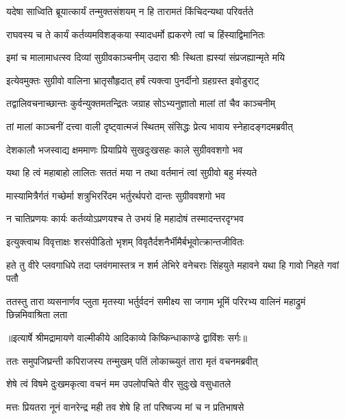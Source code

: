\twolineshloka
{यदेषा साध्विति ब्रूयात्कार्यं तन्मुक्तसंशयम्}
{न हि तारामतं किंचिदन्यथा परिवर्तते} %

\twolineshloka
{राघवस्य च ते कार्यं कर्तव्यमविशङ्कया}
{स्यादधर्मो ह्यकरणे त्वां च हिंस्याद्विमानितः} %

\twolineshloka
{इमां च मालामाधत्स्व दिव्यां सुग्रीवकाञ्चनीम्}
{उदारा श्रीः स्थिता ह्यस्यां संप्रजह्यान्मृते मयि} %

\twolineshloka
{इत्येवमुक्तः सुग्रीवो वालिना भ्रातृसौहृदात्}
{हर्षं त्यक्त्वा पुनर्दीनो ग्रहग्रस्त इवोडुराट्} %

\twolineshloka
{तद्वालिवचनाच्छान्तः कुर्वन्युक्तमतन्द्रितः}
{जग्राह सोऽभ्यनुज्ञातो मालां तां चैव काञ्चनीम्} %

\twolineshloka
{तां मालां काञ्चनीं दत्त्वा वाली दृष्ट्वात्मजं स्थितम्}
{संसिद्धः प्रेत्य भावाय स्नेहादङ्गदमब्रवीत्} %

\twolineshloka
{देशकालौ भजस्वाद्य क्षममाणः प्रियाप्रिये}
{सुखदुःखसहः काले सुग्रीववशगो भव} %

\twolineshloka
{यथा हि त्वं महाबाहो लालितः सततं मया}
{न तथा वर्तमानं त्वां सुग्रीवो बहु मंस्यते} %

\twolineshloka
{मास्यामित्रैर्गतं गच्छेर्मा शत्रुभिररिंदम}
{भर्तुरर्थपरो दान्तः सुग्रीववशगो भव} %

\twolineshloka
{न चातिप्रणयः कार्यः कर्तव्योऽप्रणयश्च ते}
{उभयं हि महादोषं तस्मादन्तरदृग्भव} %

\twolineshloka
{इत्युक्त्वाथ विवृत्ताक्षः शरसंपीडितो भृशम्}
{विवृतैर्दशनैर्भीमैर्बभूवोत्क्रान्तजीवितः} %

\fourlineindentedshloka
{हते तु वीरे प्लवगाधिपे तदा}
{ प्लवंगमास्तत्र न शर्म लेभिरे}
{वनेचराः सिंहयुते महावने}
{ यथा हि गावो निहते गवां पतौ} %

\fourlineindentedshloka
{ततस्तु तारा व्यसनार्णव प्लुता}
{ मृतस्या भर्तुर्वदनं समीक्ष्य सा}
{जगाम भूमिं परिरभ्य वालिनं}
{ महाद्रुमं छिन्नमिवाश्रिता लता} %


{॥इत्यार्षे श्रीमद्रामायणे वाल्मीकीये आदिकाव्ये किष्किन्धाकाण्डे द्वाविंशः सर्गः॥}


\twolineshloka
{ततः समुपजिघ्रन्ती कपिराजस्य तन्मुखम्}
{पतिं लोकाच्च्युतं तारा मृतं वचनमब्रवीत्} %

\twolineshloka
{शेषे त्वं विषमे दुःखमकृत्वा वचनं मम}
{उपलोपचिते वीर सुदुःखे वसुधातले} %

\twolineshloka
{मत्तः प्रियतरा नूनं वानरेन्द्र मही तव}
{शेषे हि तां परिष्वज्य मां च न प्रतिभाषसे} %

